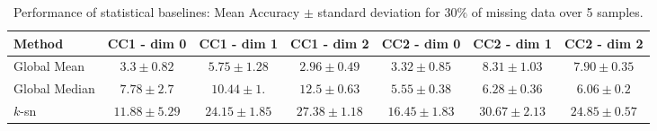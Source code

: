 \begin{table}[htbp]
  \centering
  \scriptsize{
  \begin{tabular}{lcccccc}
    \toprule
    Method   & CC1 - dim 0   & CC1 - dim 1   & CC1 - dim 2   & CC2 - dim 0  & CC2 - dim 1  & CC2 - dim 2 \\
    \midrule
   Global Mean & $3.3 \pm 0.82$ & $5.75\pm 1.28$  &$ 2.96\pm 0.49$  & $3.32 \pm 0.85$ & $8.31 \pm 1.03$  & $7.90\pm 0.35$\\
    Global Median & $7.78 \pm 2.7$   & $10.44 \pm 1.$ &$ 12.5 \pm 0.63 $ & $5.55 \pm 0.38 $&$ 6.28\pm 0.36  $&$ 6.06\pm 0.2$\\
    $k$-sn & $11.88\pm 5.29 $& $24.15 \pm 1.85$ & $27.38 \pm 1.18  $& $16.45 \pm 1.83 $&$ 30.67\pm 2.13$   &$ 24.85 \pm 0.57 $\\
    \bottomrule
  \end{tabular}}
   \vspace{2pt}
  \caption{%
      Performance of statistical baselines: Mean Accuracy $\pm$ standard deviation for $30\%$ of missing data over 5 samples.
  }\label{table:comparison-SNN}
\end{table}%
